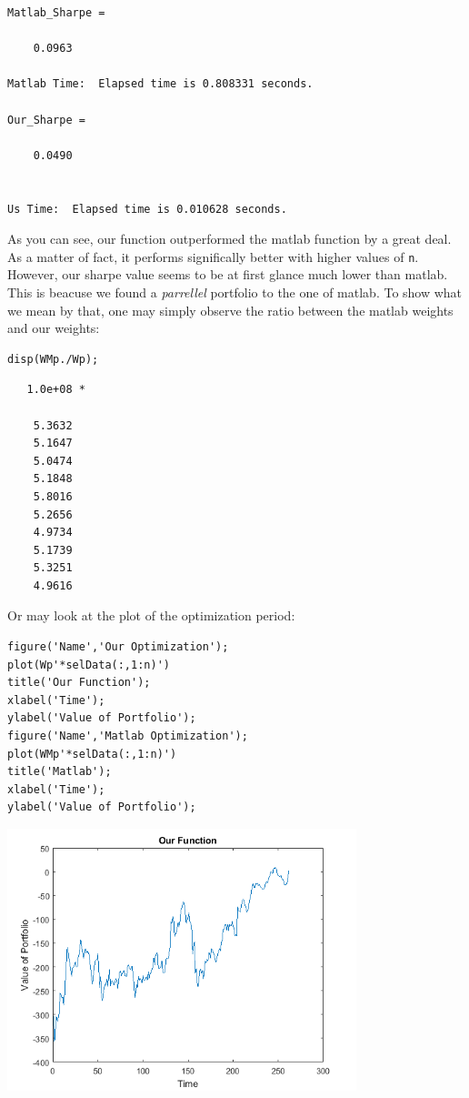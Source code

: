 \documentclass[12pt,titlepage,a4paper]{article}
\begin{document}
        \color{lightgray} \begin{verbatim}
Matlab_Sharpe =

    0.0963

Matlab Time:  Elapsed time is 0.808331 seconds.

Our_Sharpe =

    0.0490


Us Time:  Elapsed time is 0.010628 seconds.
\end{verbatim} \color{black}
    \begin{par}
As you can see, our function outperformed the matlab function by a great deal. As a matter of fact, it performs significally better with higher values of \texttt{n}. However, our sharpe value seems to be at first glance much lower than matlab. This is beacuse we found a \textit{parrellel} portfolio to the one of matlab. To show what we mean by that, one may simply observe the ratio between the matlab weights and our weights:
\end{par} \vspace{1em}
\begin{verbatim}
disp(WMp./Wp);
\end{verbatim}

        \color{lightgray} \begin{verbatim}   1.0e+08 *

    5.3632
    5.1647
    5.0474
    5.1848
    5.8016
    5.2656
    4.9734
    5.1739
    5.3251
    4.9616

\end{verbatim} \color{black}
    \begin{par}
Or may look at the plot of the optimization period:
\end{par} \vspace{1em}
\begin{verbatim}
figure('Name','Our Optimization');
plot(Wp'*selData(:,1:n)')
title('Our Function');
xlabel('Time');
ylabel('Value of Portfolio');
figure('Name','Matlab Optimization');
plot(WMp'*selData(:,1:n)')
title('Matlab');
xlabel('Time');
ylabel('Value of Portfolio');
\end{verbatim}

\includegraphics [width=4in]{testing_01.png}
\end{document}

